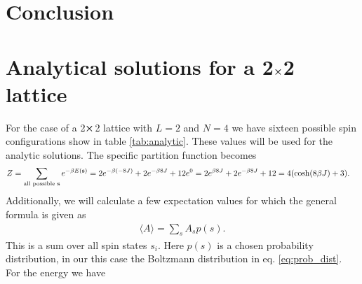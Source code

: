 \documentclass[english,notitlepage,reprint,nofootinbib]{revtex4-1}  %
\begin{document}
\section{Conclusion}\label{sec:conclusion}



\onecolumngrid

%


\newpage
\appendix
\raggedbottom

\section{Analytical solutions for a 2$\cross$2 lattice}\label{appendix:analytic}
For the case of a 2$\cross$2 lattice with $L=2$ and $N=4$ we have sixteen possible spin configurations show in table \ref{tab:analytic}. These values will be used for the analytic solutions. The specific partition function becomes
\begin{align*}
    Z & =  \sum_{\text{all possible \textbf{s}}} e^{- \beta E(\textbf{s})}
    = 2e^{- \beta (-8J)} + 2e^{- \beta 8J} + 12e^0
    = 2 e^{\beta 8J} + 2 e^{- \beta 8J} + 12
    = 4 (\cosh(8 \beta J) + 3).
\end{align*}
Additionally, we will calculate a few expectation values for which the general formula is given as
\begin{align*}
    \langle A \rangle = \sum_s A_s p(s).
\end{align*}
This is a sum over all spin states $s_i$. Here $p(s)$ is a chosen probability distribution, in our this case the Boltzmann distribution in eq. \ref{eq:prob_dist}. For the energy we have
\end{document}
